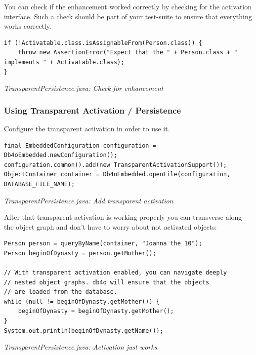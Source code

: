 You can check if the enhancement worked correctly by checking for the activation interface. Such a check should be part of your test-suite to ensure that everything works correctly.

\begin{lstlisting}
if (!Activatable.class.isAssignableFrom(Person.class)) {
    throw new AssertionError("Expect that the " + Person.class + " implements " + Activatable.class);
}
\end{lstlisting}

{\small\itshape TransparentPersistence.java: Check for enhancement\par}
\medskip

\subsubsection{Using Transparent Activation / Persistence}
\label{ref:basics-transparentpersistence-ta-enhanced-example:usingtp}

Configure the transparent activation in order to use it.

\begin{lstlisting}
final EmbeddedConfiguration configuration = Db4oEmbedded.newConfiguration();
configuration.common().add(new TransparentActivationSupport());
ObjectContainer container = Db4oEmbedded.openFile(configuration, DATABASE_FILE_NAME);
\end{lstlisting}

{\small\itshape TransparentPersistence.java: Add transparent activation\par}
\medskip

After that transparent activation is working properly you can transverse along the object graph and don't have to worry about not activated objects:

\begin{lstlisting}
Person person = queryByName(container, "Joanna the 10");
Person beginOfDynasty = person.getMother();

// With transparent activation enabled, you can navigate deeply
// nested object graphs. db4o will ensure that the objects
// are loaded from the database.
while (null != beginOfDynasty.getMother()) {
    beginOfDynasty = beginOfDynasty.getMother();
}
System.out.println(beginOfDynasty.getName());
\end{lstlisting}

{\small\itshape TransparentPersistence.java: Activation just works\par}
\medskip

